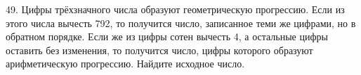 49. Цифры трёхзначного числа образуют геометрическую прогрессию. Если из этого числа вычесть 792, то получится число, записанное теми же цифрами, но в обратном порядке. Если же из цифры сотен вычесть 4, а остальные цифры оставить без изменения, то получится число, цифры которого образуют арифметическую прогрессию. Найдите исходное число.
\newpage
